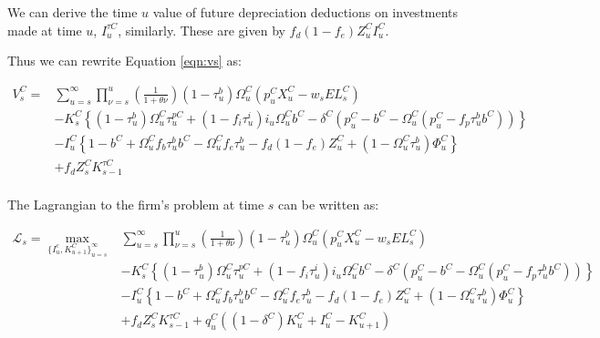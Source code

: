 \documentclass[article,11pt,letterpaper,fleqn]{article}
\theoremstyle{definition}
\numberwithin{equation}{section}
\begin{document}
We can derive the time $u$ value of future depreciation deductions on investments made at time $u$, $I^{\tau C}_{u}$, similarly.  These are given by $f_{d}(1-f_{e})Z^{C}_{u}I^{C}_{u}$.

Thus we can rewrite Equation \ref{eqn:vs} as: 

 \begin{equation}
\label{eqn:vs_w_z}
\begin{split}
V^{C}_{s} = &  \sum_{u=s}^{\infty} \prod_{\nu=s}^{u}\left(\frac{1}{1+\theta{\nu}}\right) (1-\tau^{b}_{u})\Omega^{C}_{u}(p^{C}_{u}X^{C}_{u}-w_{s}EL^{C}_{s})  \\ 
 & - K^{C}_{s} \left\{(1-\tau^{b}_{u})\Omega^{C}_{u}\tau^{pC}_{u}+(1-f_{i}\tau^{i}_{u})i_{u}\Omega^{C}_{u}b^{C}-\delta^{C}(p^{C}_{u}-b^{C}-\Omega^{C}_{u}(p^{C}_{u}-f_{p}\tau^{b}_{u}b^{C}))\right\}  \\
 & - I^{C}_{u}\left\{1-b^{C}+\Omega^{C}_{u}f_{b}\tau^{b}_{u}b^{C}-\Omega^{C}_{u}f_{e}\tau^{b}_{u} - f_{d}(1-f_{e})Z^{C}_{u} + (1-\Omega^{C}_{u}\tau^{b}_{u})\Phi^{C}_{u}\right\} \\
 &  + f_{d}Z^{C}_{s}K^{\tau C}_{s-1} \\
\end{split}
\end{equation}


The Lagrangian to the firm's problem at time $s$ can be written as:

 \begin{equation}
\label{eqn:lagrangian}
\begin{split}
\mathcal{L}_{s} = \max_{\{I^{c}_{u},K^{C}_{u+1}\}^{\infty}_{u=s}} &  \sum_{u=s}^{\infty} \prod_{\nu=s}^{u}\left(\frac{1}{1+\theta{\nu}}\right) (1-\tau^{b}_{u})\Omega^{C}_{u}(p^{C}_{u}X^{C}_{u}-w_{s}EL^{C}_{s})  \\ 
 & - K^{C}_{s} \left\{(1-\tau^{b}_{u})\Omega^{C}_{u}\tau^{pC}_{u}+(1-f_{i}\tau^{i}_{u})i_{u}\Omega^{C}_{u}b^{C}-\delta^{C}(p^{C}_{u}-b^{C}-\Omega^{C}_{u}(p^{C}_{u}-f_{p}\tau^{b}_{u}b^{C}))\right\}  \\
 & - I^{C}_{u}\left\{1-b^{C}+\Omega^{C}_{u}f_{b}\tau^{b}_{u}b^{C}-\Omega^{C}_{u}f_{e}\tau^{b}_{u} - f_{d}(1-f_{e})Z^{C}_{u} + (1-\Omega^{C}_{u}\tau^{b}_{u})\Phi^{C}_{u}\right\} \\
 &  + f_{d}Z^{C}_{s}K^{\tau C}_{s-1} + q^{C}_{u}((1-\delta^{C})K^{C}_{u} + I^{C}_{u}-K^{C}_{u+1})\\
\end{split}
\end{equation}
\end{document}
